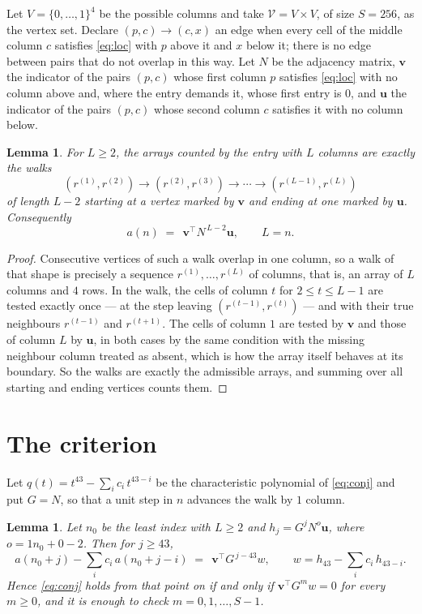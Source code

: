 \documentclass[11pt,a4paper]{article}
\theoremstyle{plain}
\newtheorem{lemma}[theorem]{Lemma}
\theoremstyle{definition}
\begin{document}
Let $V=\{0,\dots,1\}^{4}$ be the possible columns and take
$\mathcal V=V\times V$, of size $S=256$, as the vertex set. Declare $(p,c)\to(c,x)$ an edge
when every cell of the middle column $c$ satisfies \eqref{eq:loc} with $p$ above it and $x$
below it; there is no edge between pairs that do not overlap in this way. Let $N$ be the
adjacency matrix, $\mathbf{v}$ the indicator of the pairs $(p,c)$ whose first column $p$
satisfies \eqref{eq:loc} with no column above and, where the entry demands it, whose first entry is $0$, and $\mathbf{u}$ the indicator of
the pairs $(p,c)$ whose second column $c$ satisfies it with no column below.

\begin{lemma}\label{lem:walk}
For $L\ge2$, the arrays counted by the entry with $L$ columns are exactly the walks
\[
(r^{(1)},r^{(2)})\to(r^{(2)},r^{(3)})\to\cdots\to(r^{(L-1)},r^{(L)})
\]
of length $L-2$ starting at a vertex marked by $\mathbf{v}$ and ending at one marked by
$\mathbf{u}$. Consequently
\[
a(n)\;=\;\,\mathbf{v}^{\!\top}N^{\,L-2}\mathbf{u},\qquad L=n .
\]
\end{lemma}

\begin{proof}
Consecutive vertices of such a walk overlap in one column, so a walk of that shape is
precisely a sequence $r^{(1)},\dots,r^{(L)}$ of columns, that is, an array of $L$ columns
and $4$ rows. In the walk, the cells of column $t$ for $2\le t\le L-1$ are tested
exactly once --- at the step leaving $(r^{(t-1)},r^{(t)})$ --- and with their true
neighbours $r^{(t-1)}$ and $r^{(t+1)}$. The cells of column $1$ are tested by
$\mathbf{v}$ and those of column $L$ by $\mathbf{u}$, in both cases by the same condition
with the missing neighbour column treated as absent, which is how the array itself behaves at
its boundary. So the walks are exactly the admissible arrays, and summing over all starting
and ending vertices counts them.
\end{proof}

\section{The criterion}

Let $q(t)=t^{43}-\sum_i c_i\,t^{43-i}$ be the characteristic polynomial of
\eqref{eq:conj} and put $G=N$, so that a unit step in $n$ advances the walk by
$1$ column.

\begin{lemma}\label{lem:crit}
Let $n_0$ be the least index with $L\ge2$ and $h_j=G^{j}N^{o}\mathbf{u}$, where
$o=1n_0+0-2$. Then for $j\ge43$,
\[
a(n_0+j)-\sum_i c_i\,a(n_0+j-i)\;=\;\,\mathbf{v}^{\!\top}G^{\,j-43}w,
\qquad w=h_{43}-\sum_i c_i\,h_{43-i} .
\]
Hence \eqref{eq:conj} holds from that point on if and only if
$\mathbf{v}^{\!\top}G^{m}w=0$ for every $m\ge0$, and it is enough to check
$m=0,1,\dots,S-1$.
\end{lemma}
\end{document}
